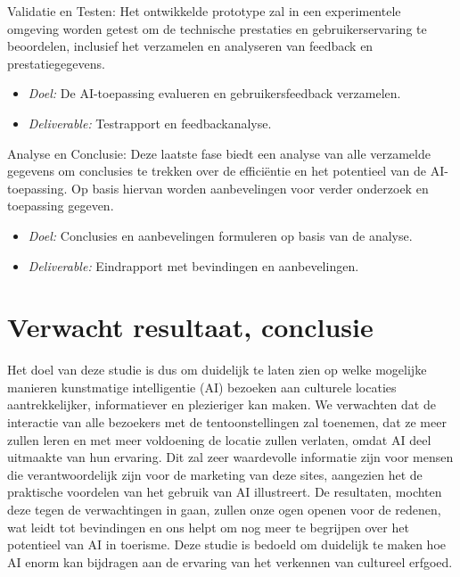 Validatie en Testen:
Het ontwikkelde prototype zal in een experimentele omgeving worden getest om de technische prestaties en gebruikerservaring te beoordelen, inclusief het verzamelen en analyseren van feedback en prestatiegegevens.
\begin{itemize}
    \item \textit{Doel:} De AI-toepassing evalueren en gebruikersfeedback verzamelen.
    \item \textit{Deliverable:} Testrapport en feedbackanalyse.
\end{itemize}

Analyse en Conclusie:
Deze laatste fase biedt een analyse van alle verzamelde gegevens om conclusies te trekken over de efficiëntie en het potentieel van de AI-toepassing. Op basis hiervan worden aanbevelingen voor verder onderzoek en toepassing gegeven.
\begin{itemize}
    \item \textit{Doel:} Conclusies en aanbevelingen formuleren op basis van de analyse.
    \item \textit{Deliverable:} Eindrapport met bevindingen en aanbevelingen.
\end{itemize}

\section{Verwacht resultaat, conclusie}%
\label{sec:verwachte_resultaten}

Het doel van deze studie is dus om duidelijk te laten zien op welke mogelijke manieren kunstmatige intelligentie (AI) bezoeken aan culturele locaties aantrekkelijker, informatiever en plezieriger kan maken. We verwachten dat de interactie van alle bezoekers met de tentoonstellingen zal toenemen, dat ze meer zullen leren en met meer voldoening de locatie zullen verlaten, omdat AI deel uitmaakte van hun ervaring. Dit zal zeer waardevolle informatie zijn voor mensen die verantwoordelijk zijn voor de marketing van deze sites, aangezien het de praktische voordelen van het gebruik van AI illustreert. De resultaten, mochten deze tegen de verwachtingen in gaan, zullen onze ogen openen voor de redenen, wat leidt tot bevindingen en ons helpt om nog meer te begrijpen over het potentieel van AI in toerisme. Deze studie is bedoeld om duidelijk te maken hoe AI enorm kan bijdragen aan de ervaring van het verkennen van cultureel erfgoed.

